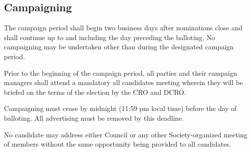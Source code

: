 \subsection{Campaigning}
\begin{longenum}[ label*=\thesubsection.\arabic*., align=left]
	\item The campaign period shall begin two business days after nominations close and shall continue up to and including the day preceding the balloting. No campaigning may be undertaken other than during the designated campaign period.
    \item Prior to the beginning of the campaign period, all parties and their campaign
managers shall attend a mandatory all candidates meeting wherein they will be briefed on the terms of the election by the CRO and DCRO.
    \item Campaigning must cease by midnight (11:59 pm local time) before the day of balloting. All advertising must be removed by this deadline. 
    \item No candidate may address either Council or any other Society-organized meeting of members without the same opportunity being provided to all candidates.
\end{longenum}
